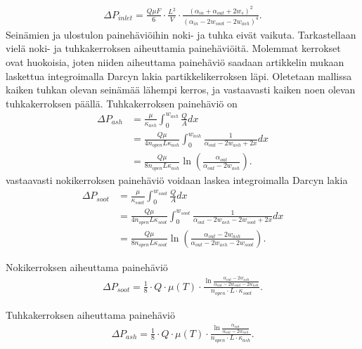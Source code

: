 \begin{align}
    \Delta P_{inlet} = \frac{Q \mu F}{6}\cdot \frac{L^2}{V} \cdot \frac{(\alpha_{in}+\alpha_{out}+2 w_s)^2}{(\alpha_{in}-2w_{soot}-2w_{ash})^4}.
    \label{eq:PDinletchannel}
\end{align}
Seinämien ja ulostulon painehäviöihin noki- ja tuhka eivät vaikuta. 
Tarkastellaan vielä noki- ja tuhkakerroksen aiheuttamia painehäviöitä. Molemmat kerrokset ovat huokoisia, joten niiden aiheuttama painehäviö saadaan artikkelin \cite{Konstandopoulos2000} mukaan laskettua integroimalla Darcyn lakia partikkelikerroksen läpi. Oletetaan mallissa kaiken tuhkan olevan seinämää lähempi kerros, ja vastaavasti kaiken noen olevan tuhkakerroksen päällä.
Tuhkakerroksen painehäviö on
\begin{align*}
    \Delta P_{ash} &= \frac{\mu}{\kappa_{ash}} \int_0^{w_{ash}}  \frac{Q}{A}dx 
    \\ &= \frac{Q \mu }{4 n_{open} L \kappa_{ash}} \int_0^{w_{ash}}  \frac{1}{\alpha_{out}-2w_{ash}+2x}dx 
    \\ &= \frac{Q\mu}{8 n_{open} L \kappa_{ash}}\ln\left(\frac{\alpha_{out}}{\alpha_{out}-2w_{ash}}\right).
\end{align*}
vastaavasti nokikerroksen painehäviö voidaan laskea integroimalla Darcyn lakia 
\begin{align*}
    \Delta P_{soot }&= \frac{\mu}{\kappa_{soot}} \int_{0}^{w_{soot}}  \frac{Q}{A}dx \\
    &= \frac{Q \mu }{4 n_{open} L \kappa_{soot}} \int_{0}^{w_{soot}}  \frac{1}{\alpha_{out}-2w_{ash}-2w_{soot}+2x}dx 
    \\ &= \frac{Q\mu}{8 n_{open} L \kappa_{soot}}\ln\left(\frac{\alpha_{out}-2w_{ash}}{\alpha_{out}-2w_{ash}-2w_{soot}}\right).
\end{align*}



Nokikerroksen aiheuttama painehäviö
\begin{align}
    \Delta P_{soot} =  \frac{1}{8} \cdot
    Q \cdot \mu(T) \cdot 
    \frac{\ln{\frac{\alpha_{out}-2w_{ash}}{\alpha_{out}-2w_{soot}-2w_{ash}}}}
    {n_{open}\cdot L \cdot \kappa_{soot}}.
    \label{eq:PDsootlayer}
\end{align}

Tuhkakerroksen aiheuttama painehäviö
\begin{align}
    \Delta P_{ash} = \frac{1}{8} \cdot
    Q \cdot \mu(T) \cdot 
    \frac{\ln{\frac{\alpha_{out}}{\alpha_{out}-2w_{ash}}}}
    {n_{open}\cdot L \cdot \kappa_{ash}}.
    \label{eq:PDashlayer}
\end{align}
